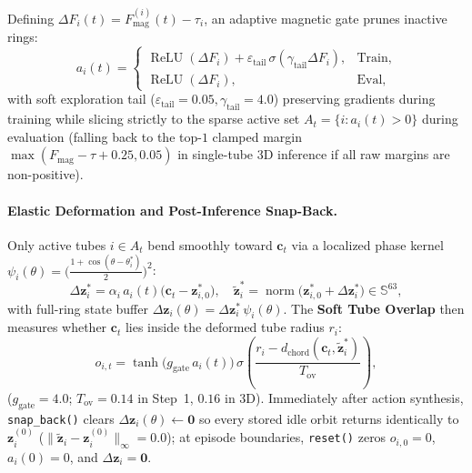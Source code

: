 \documentclass[10pt,twocolumn]{article}
\begin{document}
Defining $\Delta F_i(t) = F_{\text{mag}}^{(i)}(t) - \tau_i$, an adaptive magnetic gate prunes inactive rings:
\begin{equation}
  a_i(t) =
  \begin{cases}
    \operatorname{ReLU}(\Delta F_i) + \varepsilon_{\text{tail}}\,\sigma(\gamma_{\text{tail}}\Delta F_i), & \text{Train}, \\
    \operatorname{ReLU}(\Delta F_i), & \text{Eval},
  \end{cases}
  \label{eq:gate}
\end{equation}
with soft exploration tail ($\varepsilon_{\text{tail}}=0.05, \gamma_{\text{tail}}=4.0$) preserving gradients during training while slicing strictly to the sparse active set $A_t = \{i : a_i(t) > 0\}$ during evaluation (falling back to the top-$1$ clamped margin $\max(F_{\text{mag}}-\tau+0.25, 0.05)$ in single-tube 3D inference if all raw margins are non-positive).

\paragraph{Elastic Deformation and Post-Inference Snap-Back.}
Only active tubes $i \in A_t$ bend smoothly toward $\mathbf{c}_t$ via a localized phase kernel $\psi_i(\theta) = \bigl(\tfrac{1 + \cos(\theta - \theta_i^*)}{2}\bigr)^2$:
\begin{equation}
  \Delta \mathbf{z}_i^* = \alpha_i\,a_i(t)\bigl(\mathbf{c}_t - \mathbf{z}_{i,0}^*\bigr), \quad
  \tilde{\mathbf{z}}_i^* = \operatorname{norm}\!\bigl(\mathbf{z}_{i,0}^* + \Delta\mathbf{z}_i^*\bigr) \in \mathbb{S}^{63},
\end{equation}
with full-ring state buffer $\Delta\mathbf{z}_i(\theta) = \Delta\mathbf{z}_i^*\,\psi_i(\theta)$. The \textbf{Soft Tube Overlap} then measures whether $\mathbf{c}_t$ lies inside the deformed tube radius $r_i$:
\begin{equation}
  o_{i,t} = \tanh\!\bigl(g_{\text{gate}}\,a_i(t)\bigr)\,\sigma\!\left(\frac{r_i - d_{\text{chord}}(\mathbf{c}_t, \tilde{\mathbf{z}}_i^*)}{T_{\text{ov}}}\right),
\end{equation}
($g_{\text{gate}}=4.0$; $T_{\text{ov}}=0.14$ in Step~1, $0.16$ in 3D). Immediately after action synthesis, \texttt{snap\_back()} clears $\Delta\mathbf{z}_i(\theta) \leftarrow \mathbf{0}$ so every stored idle orbit returns identically to $\mathbf{z}_i^{(0)}$ ($\|\tilde{\mathbf{z}}_i - \mathbf{z}_i^{(0)}\|_\infty = 0.0$); at episode boundaries, \texttt{reset()} zeros $o_{i,0}=0$, $a_i(0)=0$, and $\Delta\mathbf{z}_i=\mathbf{0}$.
\end{document}
